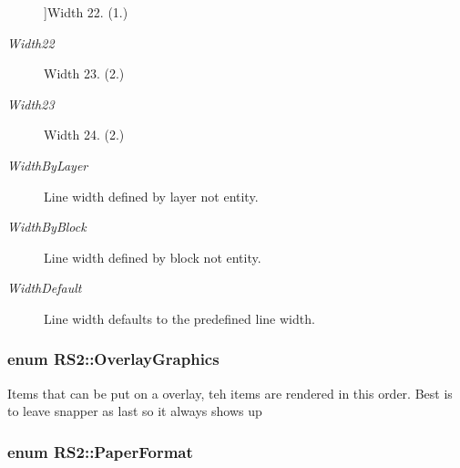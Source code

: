 \begin{Desc}
\begin{description}
{}]Width 22. (1.\-58mm) \item[{\em 
\hypertarget{classRS2_a023485c482c5ee9e36b3dfad781adf29a982ab2cbc000ba615b7862cee8d8f0e7}{Width22}\label{classRS2_a023485c482c5ee9e36b3dfad781adf29a982ab2cbc000ba615b7862cee8d8f0e7}
}]Width 23. (2.\-00mm) \item[{\em 
\hypertarget{classRS2_a023485c482c5ee9e36b3dfad781adf29a1e64fa9cb464329d20da417a0e0ff8ce}{Width23}\label{classRS2_a023485c482c5ee9e36b3dfad781adf29a1e64fa9cb464329d20da417a0e0ff8ce}
}]Width 24. (2.\-11mm) \item[{\em 
\hypertarget{classRS2_a023485c482c5ee9e36b3dfad781adf29a069965d8c63bd878b2eab03f943465e5}{Width\-By\-Layer}\label{classRS2_a023485c482c5ee9e36b3dfad781adf29a069965d8c63bd878b2eab03f943465e5}
}]Line width defined by layer not entity. \item[{\em 
\hypertarget{classRS2_a023485c482c5ee9e36b3dfad781adf29a06dbfb199684a461e0a78f67878af6cd}{Width\-By\-Block}\label{classRS2_a023485c482c5ee9e36b3dfad781adf29a06dbfb199684a461e0a78f67878af6cd}
}]Line width defined by block not entity. \item[{\em 
\hypertarget{classRS2_a023485c482c5ee9e36b3dfad781adf29abb16037a252d81186258f11eebeffcf5}{Width\-Default}\label{classRS2_a023485c482c5ee9e36b3dfad781adf29abb16037a252d81186258f11eebeffcf5}
}]Line width defaults to the predefined line width. \end{description}
\end{Desc}
\hypertarget{classRS2_ad08097f2c67307c83fbea0439830f56c}{
\subsubsection[{Overlay\-Graphics}]{\setlength{\rightskip}{0pt plus 5cm}enum {\bf R\-S2\-::\-Overlay\-Graphics}}}\label{classRS2_ad08097f2c67307c83fbea0439830f56c}
Items that can be put on a overlay, teh items are rendered in this order. Best is to leave snapper as last so it always shows up \hypertarget{classRS2_a99636ecac997160f1e2982859a043cb4}{
\subsubsection[{Paper\-Format}]{\setlength{\rightskip}{0pt plus 5cm}enum {\bf R\-S2\-::\-Paper\-Format}}}\label{classRS2_a99636ecac997160f1e2982859a043cb4}
